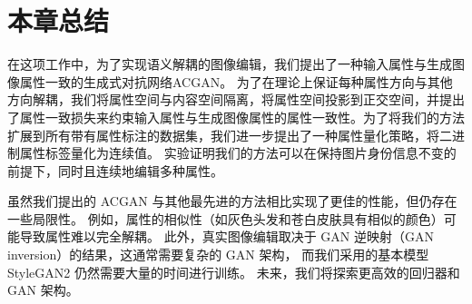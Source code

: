 \section{本章总结}
在这项工作中，为了实现语义解耦的图像编辑，我们提出了一种输入属性与生成图像属性一致的生成式对抗网络ACGAN。 为了在理论上保证每种属性方向与其他方向解耦，我们将属性空间与内容空间隔离，将属性空间投影到正交空间，并提出了属性一致损失来约束输入属性与生成图像属性的属性一致性。为了将我们的方法扩展到所有带有属性标注的数据集，我们进一步提出了一种属性量化策略，将二进制属性标签量化为连续值。 实验证明我们的方法可以在保持图片身份信息不变的前提下，同时且连续地编辑多种属性。

虽然我们提出的 ACGAN 与其他最先进的方法相比实现了更佳的性能，但仍存在一些局限性。 例如，属性的相似性（如灰色头发和苍白皮肤具有相似的颜色）可能导致属性难以完全解耦。 此外，真实图像编辑取决于 GAN 逆映射（GAN inversion）的结果，这通常需要复杂的 GAN 架构， 而我们采用的基本模型 StyleGAN2 仍然需要大量的时间进行训练。 未来，我们将探索更高效的回归器和 GAN 架构。
